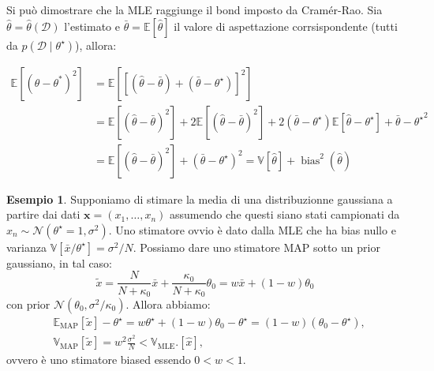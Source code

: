 \documentclass[10pt]{article}
\DeclareMathOperator{\bias}{bias}
\newcommand{\ve}[1]{\bm{#1}}
\newcommand{\cond}{\mid}
\theoremstyle{definition}
\newtheorem{example}{Esempio}[section]
\begin{document}
    Si può dimostrare che la MLE raggiunge il bond imposto da Cramér-Rao. Sia
    \( \hat{\theta} = \hat{\theta} \left( \mathcal{D} \right) \) l'estimato e \(
    \bar{\theta} = \mathbb{E} \left[ \hat{\theta} \right] \) il valore di
    aspettazione corrsispondente (tutti da \(p \left(
    \mathcal{D}\cond\theta^\star \right) \)), allora:

    \begin{equation}
        \begin{split}
            \mathbb{E} \left[ {\left( \hat{\theta} - \theta^* \right)}^2 \right] &= \mathbb{E} \left[ {\left[ ( \hat{\theta} - \bar{\theta} ) + ( \bar{\theta} - \theta^\star )\right]}^2 \right] \\
            &= \mathbb{E} \left[ {\left( \hat{\theta} - \bar{\theta} \right)}^2 \right] + 2\mathbb{E} \left[ {\left( \hat{\theta}-\bar{\theta} \right)}^2 \right] + 2\left( \bar{\theta} - \theta^\star \right)\mathbb{E} \left[ \hat{\theta} - \theta^\star \right] + {\bar{\theta}-\theta^\star}^2 \\
            &= \mathbb{E} \left[ {\left( \hat{\theta} - \bar{\theta} \right)}^2 \right]  + {\left( \bar{\theta} - \theta^\star \right)}^2 = \mathbb{V}\left[\hat{\theta}\right] + \bias^2 \left( \hat{\theta} \right)
        \end{split}
    \end{equation}

    \begin{example}
        Supponiamo di stimare la media di una distribuzionne gaussiana a partire dai dati
        \mbox{\( \ve{x} = \left( x_1, \ldots, x_n \right) \)} assumendo che questi siano stati campionati da
        \( x_n \sim \mathcal{N} \left( \theta^\star = 1, \sigma^2 \right) \). Uno stimatore ovvio è dato dalla MLE
        che ha bias nullo e varianza \( \mathbb{V} [\bar{x}/\theta^\star] = \sigma^2/N \).
        Possiamo dare uno stimatore MAP sotto un prior gaussiano, in tal caso:
        \[
            \tilde{x} = \frac{N}{N + \kappa_0} \bar{x} + \frac{\kappa_0}{N + \kappa_0}\theta_0 = w\bar{x} + \left( 1-w \right) \theta_0
        \]
        con prior \( \mathcal{N} \left( \theta_0, \sigma^2 / \kappa_0 \right) \). Allora abbiamo:
        \begin{align*}
            &\mathbb{E}_{\text{MAP}} \left[ \tilde{x} \right] - \theta^\star = w\theta^\star + (1 - w)\theta_0 - \theta^\star = \left( 1-w \right) \left( \theta_0 - \theta^\star \right),  \\
            &\mathbb{V}_{\text{MAP}} \left[ \tilde{x} \right] = w^2\frac{\sigma^2}{N} < \mathbb{V}_\text{MLE} .\left[ \hat{x} \right],
        \end{align*}
        ovvero è uno stimatore biased essendo \( 0 < w < 1\).
    \end{example}

    
\end{document}

